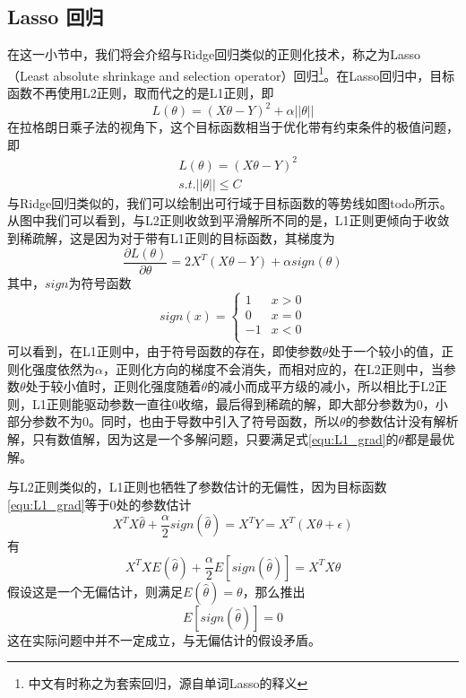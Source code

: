 \subsection{Lasso 回归} %
\label{sub:lasso_回归}
在这一小节中，我们将会介绍与Ridge回归类似的正则化技术，称之为Lasso（Least absolute shrinkage and selection operator）回归\footnote{中文有时称之为套索回归，源自单词Lasso的释义}。在Lasso回归中，目标函数不再使用L2正则，取而代之的是L1正则，即
\begin{equation}
	L(\theta) = (X\theta -Y)^2 + \alpha ||\theta||
\end{equation}
在拉格朗日乘子法的视角下，这个目标函数相当于优化带有约束条件的极值问题，即
\begin{equation}
	\begin{split}
		&L(\theta) = (X\theta -Y)^2 \\
		&s.t. ||\theta|| \leq C
	\end{split}
\end{equation}
与Ridge回归类似的，我们可以绘制出可行域于目标函数的等势线如图todo所示。从图中我们可以看到，与L2正则收敛到平滑解所不同的是，L1正则更倾向于收敛到稀疏解，这是因为对于带有L1正则的目标函数，其梯度为
\begin{equation}\label{equ:L1_grad}
	\frac{\partial L(\theta)}{\partial \theta} = 2X^T(X\theta - Y) + \alpha sign(\theta)
\end{equation}
其中，$sign$为符号函数
\begin{equation}
	sign(x) = \left\{\begin{array}{cc}
	1 &x > 0\\
	0 &x = 0\\
	-1 & x < 0\\
	\end{array}
	\right.
\end{equation}
可以看到，在L1正则中，由于符号函数的存在，即使参数$\theta$处于一个较小的值，正则化强度依然为$\alpha$，正则化方向的梯度不会消失，而相对应的，在L2正则中，当参数$\theta$处于较小值时，正则化强度随着$\theta$的减小而成平方级的减小，所以相比于L2正则，L1正则能驱动参数一直往0收缩，最后得到稀疏的解，即大部分参数为0，小部分参数不为0。同时，也由于导数中引入了符号函数，所以$\theta$的参数估计没有解析解，只有数值解，因为这是一个多解问题，只要满足式\ref{equ:L1_grad}的$\theta$都是最优解。

与L2正则类似的，L1正则也牺牲了参数估计的无偏性，因为目标函数\ref{equ:L1_grad}等于0处的参数估计
\begin{equation}
	X^TX\hat{\theta}+\frac{\alpha}{2}sign(\hat{\theta}) = X^TY = X^T(X\theta + \epsilon)
\end{equation}
有
\begin{equation}
	X^TXE(\hat{\theta})+\frac{\alpha}{2} E[sign(\hat{\theta})] = X^TX\theta
\end{equation}
假设这是一个无偏估计，则满足$E(\hat{\theta})=\theta$，那么推出
\begin{equation}
	E[sign(\hat{\theta})] = 0 
\end{equation}
这在实际问题中并不一定成立，与无偏估计的假设矛盾。
	

